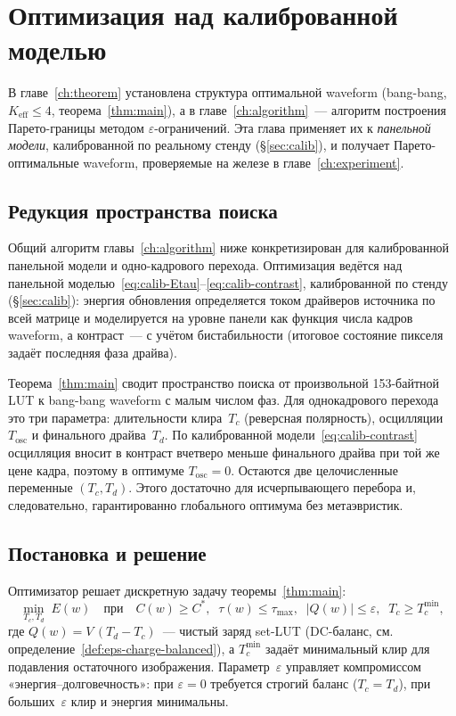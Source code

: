 \chapter{Оптимизация над калиброванной моделью}\label{ch:simulation}

В главе~\ref{ch:theorem} установлена структура оптимальной waveform (bang-bang,
$K_{\mathrm{eff}}\le4$, теорема~\ref{thm:main}), а в главе~\ref{ch:algorithm}~---
алгоритм построения Парето-границы методом $\varepsilon$-ограничений. Эта
глава применяет их к \emph{панельной модели}, калиброванной по реальному стенду
(\S\ref{sec:calib}), и получает Парето-оптимальные waveform, проверяемые на
железе в главе~\ref{ch:experiment}.

\section{Редукция пространства поиска}\label{sec:reduction}

Общий алгоритм главы~\ref{ch:algorithm} ниже конкретизирован для
калиброванной панельной модели и одно-кадрового перехода. Оптимизация ведётся над
панельной моделью~\eqref{eq:calib-Etau}--\eqref{eq:calib-contrast},
калиброванной по стенду (\S\ref{sec:calib}): энергия обновления определяется током
драйверов источника по всей матрице и моделируется на уровне панели как функция
числа кадров waveform, а контраст~--- с учётом бистабильности (итоговое состояние
пикселя задаёт последняя фаза драйва).

Теорема~\ref{thm:main} сводит пространство поиска от произвольной 153-байтной LUT
к bang-bang waveform с малым числом фаз. Для однокадрового перехода это три
параметра: длительности клира~$T_c$ (реверсная полярность), осцилляции
$T_{\mathrm{osc}}$ и финального драйва~$T_d$. По калиброванной
модели~\eqref{eq:calib-contrast} осцилляция вносит в контраст вчетверо меньше
финального драйва при той же цене кадра, поэтому в оптимуме
$T_{\mathrm{osc}}=0$. Остаются две целочисленные переменные $(T_c,T_d)$. Этого
достаточно для исчерпывающего перебора и, следовательно,
гарантированно глобального оптимума без метаэвристик.

\section{Постановка и решение}\label{sec:opt-problem}

Оптимизатор решает дискретную задачу теоремы~\ref{thm:main}:
\begin{equation}\label{eq:opt-problem}
    \min_{T_c,T_d}\; E(w)
    \quad\text{при}\quad
    C(w)\ge C^{*},\;\; \tau(w)\le \tau_{\max},\;\; |Q(w)|\le\varepsilon,\;\; T_c\ge T_c^{\min},
\end{equation}
где $Q(w)=V\,(T_d-T_c)$~--- чистый заряд set-LUT (DC-баланс, см.
определение~\ref{def:eps-charge-balanced}), а $T_c^{\min}$ задаёт минимальный клир
для подавления остаточного изображения. Параметр~$\varepsilon$ управляет
компромиссом «энергия--долговечность»: при $\varepsilon=0$ требуется строгий баланс
($T_c=T_d$), при больших~$\varepsilon$ клир и энергия минимальны.

